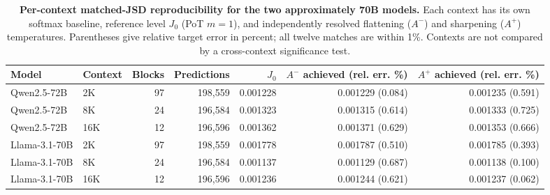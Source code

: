 \begin{table}[H]
  \centering
  \small
  \setlength{\tabcolsep}{4.0pt}
  \caption{\textbf{Per-context matched-JSD reproducibility for the two
  approximately 70B models.} Each context has its own softmax baseline, reference
  level $J_0$ (PoT $m=1$), and independently resolved flattening ($A^-$) and
  sharpening ($A^+$) temperatures. Parentheses give relative target error in
  percent; all twelve matches are within 1\%. Contexts are not compared by a
  cross-context significance test.}
  \label{tab:70b-t11-matching}
  \begin{tabular}{@{}llrrrrr@{}}
    \toprule
    Model & Context & Blocks & Predictions & $J_0$ &
    \shortstack{$A^-$ achieved\\(rel. err. \%)} &
    \shortstack{$A^+$ achieved\\(rel. err. \%)} \\
    \midrule
  Qwen2.5-72B & 2K & 97 & 198,559 & 0.001228 & 0.001229 (0.084) & 0.001235 (0.591) \\
  Qwen2.5-72B & 8K & 24 & 196,584 & 0.001323 & 0.001315 (0.614) & 0.001333 (0.725) \\
  Qwen2.5-72B & 16K & 12 & 196,596 & 0.001362 & 0.001371 (0.629) & 0.001353 (0.666) \\
  Llama-3.1-70B & 2K & 97 & 198,559 & 0.001778 & 0.001787 (0.510) & 0.001785 (0.393) \\
  Llama-3.1-70B & 8K & 24 & 196,584 & 0.001137 & 0.001129 (0.687) & 0.001138 (0.100) \\
  Llama-3.1-70B & 16K & 12 & 196,596 & 0.001236 & 0.001244 (0.621) & 0.001237 (0.062) \\
    \bottomrule
  \end{tabular}
\end{table}

